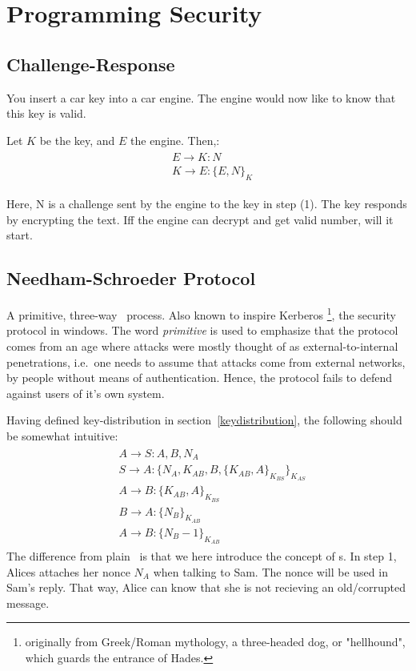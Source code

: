 \section{Programming Security}

\subsection{Challenge-Response}\label{chalres}
You insert a car key into a car engine. The engine would now like to know
that this key is valid.

Let $K$ be the key, and $E$ the engine. Then,:
\begin{gather}
    \begin{align}
        &E \rightarrow K: N \\
        &K \rightarrow E: \{E, N\}_{K}
    \end{align}
\end{gather}

Here, N is a challenge sent by the engine to the key in step (1).
The key responds by encrypting the text. Iff the engine can decrypt
and get valid number, will it start.


\subsection{Needham-Schroeder Protocol}
A primitive, three-way~ process. Also known
to inspire Kerberos%
\footnote{originally from Greek/Roman mythology, a three-headed dog, or "hellhound",
    which guards the entrance of Hades.},
the security protocol in windows. The word \textit{primitive} is used to 
emphasize that the protocol comes from an age where attacks were
mostly thought of as external-to-internal penetrations, i.e.\
one needs to assume that attacks come from external networks,
by people without means of authentication. Hence, the protocol
fails to defend against users of it's own system.

Having defined key-distribution in section~\ref{keydistribution}, the following should 
be somewhat intuitive:
\setcounter{equation}{0}
\begin{gather}
    \begin{align}
        &A \rightarrow S: A,B,N_{A}  \\
        &S \rightarrow A: \{N_A, K_{AB}, B, \{K_{AB}, A\}_{K_{BS}}\}_{K_{AS}} \\ 
        &A \rightarrow B: \{K_{AB}, A\}_{K_{BS}} \\ 
        &B \rightarrow A: \{N_B\}_{K_{AB}} \\
        &A \rightarrow B: \{N_B-1\}_{K_{AB}}
    \end{align}
\end{gather}
The difference from plain~ is that we here introduce the
concept of \nameref{nonce}s.
In step 1, Alices attaches her nonce $N_{A}$ when talking to Sam.
The nonce will be used in Sam's reply. That way, Alice can know that
she is not recieving an old/corrupted message.


